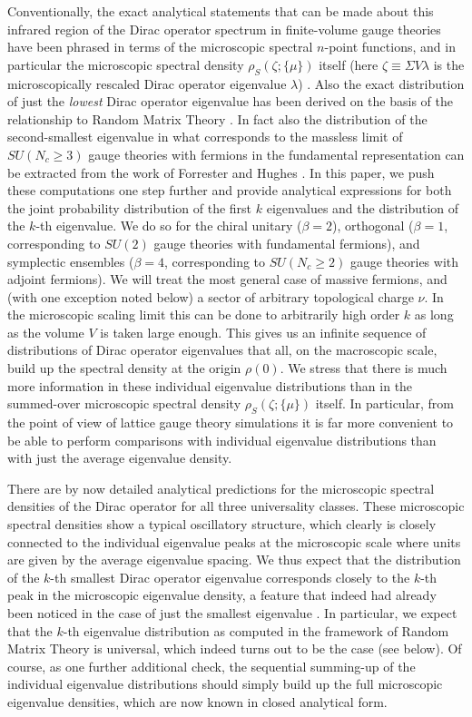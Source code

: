 Conventionally, the exact analytical statements that can be made about
this infrared region of the Dirac operator spectrum in finite-volume
gauge theories have been phrased in terms of the microscopic spectral
$n$-point functions, and in particular the microscopic spectral density
$\rho_S(\zeta;\{\mu\})$ itself (here $\zeta \equiv \Sigma V \lambda $
is the microscopically rescaled Dirac operator eigenvalue $\lambda$)
\cite{ShV,V,NS,For1,For2,AST,NF95,DN98a,WGW,NN1,AK,NN2}.
Also the exact distribution of just the {\em lowest} Dirac operator
eigenvalue has been derived on the basis of the relationship to Random
Matrix Theory \cite{For1,SlN,TW,FH,NF98,NDW,WGW,NN1}.
In fact also the distribution
of the second-smallest eigenvalue in what corresponds to the massless limit
of $SU(N_c\geq 3)$ gauge theories with fermions in the fundamental
representation can be extracted from the work of Forrester and Hughes
\cite{FH}. In this paper, we
push these computations one step further
and provide analytical expressions for
both the joint probability distribution of the first $k$ eigenvalues
and the distribution of the $k$-th eigenvalue. We do so
for the chiral unitary ($\beta=2$), orthogonal ($\beta=1$,
corresponding to $SU(2)$ gauge theories with fundamental fermions), and
symplectic ensembles
($\beta=4$, corresponding to
$SU(N_c\geq 2)$ gauge theories with adjoint fermions). We will treat
the most general case of massive fermions, and (with one exception noted
below) a sector of arbitrary topological charge $\nu$.
In the microscopic
scaling limit this can be done to arbitrarily high order $k$ as long as
the volume $V$ is taken large enough.
This gives us an infinite sequence of
distributions of Dirac operator eigenvalues that all, on the macroscopic
scale, build up the spectral density at the origin $\rho(0)$. We
stress
that there is much more information in these individual eigenvalue
distributions than in the summed-over microscopic spectral density
$\rho_S(\zeta;\{\mu\})$ itself. In particular, from the point of view of
lattice gauge theory simulations it is far more convenient to be able to
perform comparisons with individual eigenvalue distributions than with just
the average eigenvalue density.

There are by now detailed analytical predictions for the microscopic
spectral densities of the Dirac operator for all three universality
classes.
These microscopic spectral densities show
a typical oscillatory structure, which clearly is closely connected
to the individual eigenvalue peaks at the microscopic scale where units
are given by the average eigenvalue spacing. We thus expect that the
distribution of the $k$-th smallest Dirac operator eigenvalue corresponds
closely to the $k$-th peak in the microscopic eigenvalue density, a
feature that indeed had already been noticed in the case of just the
smallest eigenvalue \cite{NDW}. In particular, we expect that the
$k$-th eigenvalue distribution as computed in the framework of Random
Matrix Theory is universal, which indeed turns out to be the case (see
below). Of course, as one further additional check,
the sequential summing-up of the individual eigenvalue distributions
should simply build up the full microscopic eigenvalue densities, which
are now known in closed analytical form.

